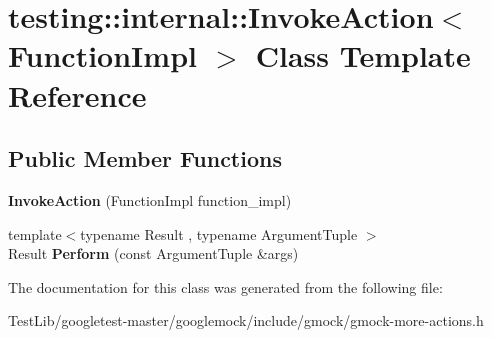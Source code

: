 \hypertarget{classtesting_1_1internal_1_1InvokeAction}{}\section{testing\+:\+:internal\+:\+:Invoke\+Action$<$ Function\+Impl $>$ Class Template Reference}
\label{classtesting_1_1internal_1_1InvokeAction}
\subsection*{Public Member Functions}
\begin{DoxyCompactItemize}
\item 
\mbox{\label{classtesting_1_1internal_1_1InvokeAction_a786ce772624fc87a31891f465df7ce61}} 
{\bfseries Invoke\+Action} (Function\+Impl function\+\_\+impl)
\item 
\mbox{\label{classtesting_1_1internal_1_1InvokeAction_af357ce691795b3520de1fda4ab8af8b2}} 
{\footnotesize template$<$typename Result , typename Argument\+Tuple $>$ }\\Result {\bfseries Perform} (const Argument\+Tuple \&args)
\end{DoxyCompactItemize}


The documentation for this class was generated from the following file\+:\begin{DoxyCompactItemize}
\item 
Test\+Lib/googletest-\/master/googlemock/include/gmock/gmock-\/more-\/actions.\+h\end{DoxyCompactItemize}
